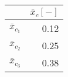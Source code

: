 \begin{tabular}{lr} 
    \toprule
                & \multicolumn{1}{l}{$\bar x_c [-] $}  \\  \midrule
    $\bar x_{c_1}$ & 0.12                                \\ 
    $\bar x_{c_2}$ & 0.25                                \\ 
    $\bar x_{c_3}$ & 0.38                                \\ 
    \bottomrule
\end{tabular}
